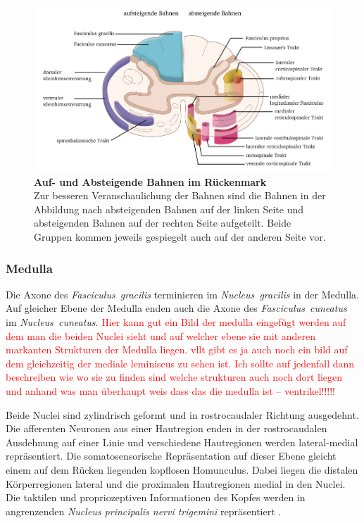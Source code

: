 \documentclass[12pt,a4paper,pdftex]{article}
\begin{document}
\begin{figure}[H]
    \centering
    \includegraphics[width = \textwidth] {pictures/somatosensory/aufabsteigendeBahnen_Rueckenmark.png}
    \caption[Auf- und Absteigende Bahnen im Rückenmark]{\textbf{Auf- und Absteigende Bahnen im Rückenmark}\\ Zur besseren Veranschaulichung der Bahnen sind die Bahnen in der Abbildung nach absteigenden Bahnen auf der linken Seite und absteigenden Bahnen auf der rechten Seite aufgeteilt. Beide Gruppen kommen jeweils gespiegelt auch auf der anderen Seite vor.}
    \label{fig:bahnen_rueckenmark}
\end{figure}

\subsubsection{Medulla}

Die Axone des \textit{Fasciculus~gracilis} terminieren im \textit{Nucleus~gracilis} in der Medulla. Auf gleicher Ebene der Medulla enden auch die Axone des \textit{Fasciculus~cuneatus} im \textit{Nucleus~cuneatus}. \textcolor{red}{Hier kann gut ein Bild der medulla eingefügt werden auf dem man die beiden Nuclei sieht und auf welcher ebene sie mit anderen markanten Strukturen der Medulla liegen. vllt gibt es ja auch noch ein bild auf dem gleichzeitig der mediale leminiscus zu sehen ist. Ich sollte auf jedenfall dann beschreiben wie wo sie zu finden sind welche strukturen auch noch dort liegen und anhand was man überhaupt weis dass das die medulla ist -- ventrikel!!!!!}


Beide Nuclei sind zylindrisch geformt und in rostrocaudaler Richtung ausgedehnt. Die afferenten Neuronen aus einer Hautregion enden in der rostrocaudalen Ausdehnung auf einer Linie und verschiedene Hautregionen werden lateral-medial repräsentiert. Die somatosensorische Repräsentation auf dieser Ebene gleicht einem auf dem Rücken liegenden kopflosen Homunculus. Dabei liegen die distalen Körperregionen lateral und die proximalen Hautregionen medial in den Nuclei. Die taktilen und propriozeptiven Informationen des Kopfes werden in angrenzenden \textit{Nucleus principalis nervi trigemini} repräsentiert \cite[Kap.~22]{kandel2013principles}. 
\end{document}
